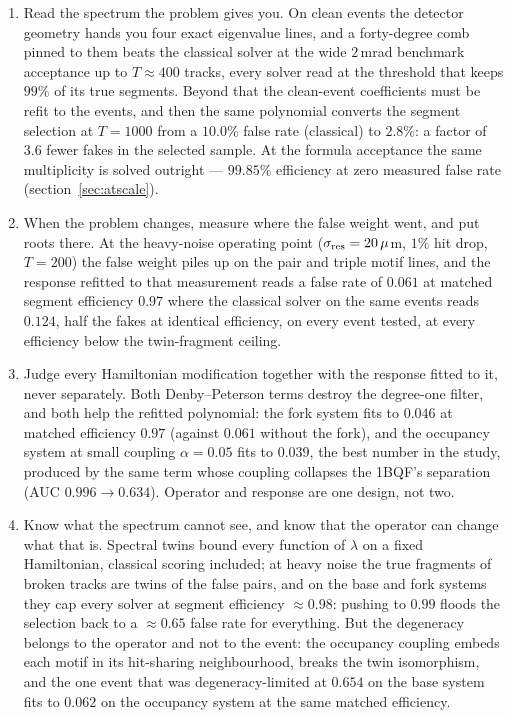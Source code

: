 \documentclass[11pt,a4paper]{article}
\begin{document}
\begin{enumerate}[leftmargin=2em]
\item Read the spectrum the problem gives you. On clean events the
detector geometry hands you four exact eigenvalue lines, and a
forty-degree comb pinned to them beats the classical solver at the
wide $2$\,mrad benchmark acceptance up to $T\approx400$ tracks, every
solver read at the threshold that keeps $99\%$ of its true segments.
Beyond that the clean-event coefficients must be refit to the events,
and then the same polynomial converts the segment selection at
$T=1000$ from a $10.0\%$ false rate (classical) to $2.8\%$: a factor
of $3.6$ fewer fakes in the selected sample. At the formula
acceptance the same multiplicity is solved outright — $99.85\%$
efficiency at zero measured false rate (section~\ref{sec:atscale}).
\item When the problem changes, measure where the false weight went,
and put roots there. At the heavy-noise operating point
($\sigma_{\rm res}=20\,\mu$m, $1\%$ hit drop, $T=200$) the false
weight piles up on the pair and triple motif lines, and the response
refitted to that measurement reads a false rate of $0.061$ at
matched segment efficiency $0.97$ where the classical solver on the
same events reads $0.124$, half the fakes at identical
efficiency, on every event tested, at every efficiency below the
twin-fragment ceiling.
\item Judge every Hamiltonian modification together with the
response fitted to it, never separately. Both Denby--Peterson terms
destroy the degree-one filter, and both help the refitted
polynomial: the fork system fits to $0.046$ at matched efficiency
$0.97$ (against $0.061$ without the fork), and the occupancy system
at small coupling $\alpha=0.05$ fits to $0.039$, the best number
in the study, produced by the same term whose coupling collapses
the 1BQF's separation (AUC $0.996\to0.634$). Operator and response
are one design, not two.
\item Know what the spectrum cannot see, and know that the
operator can change what that is. Spectral twins bound every
function of $\lambda$ on a fixed Hamiltonian, classical scoring
included; at heavy noise the true fragments of broken tracks are
twins of the false pairs, and on the base and fork systems they
cap every solver at segment efficiency $\approx0.98$: pushing to
$0.99$ floods the selection back to a $\approx0.65$ false rate for
everything. But the degeneracy belongs to the operator and not to
the event: the occupancy coupling embeds each motif in its
hit-sharing neighbourhood, breaks the twin isomorphism, and the one
event that was degeneracy-limited at $0.654$ on the base system fits to
$0.062$ on the occupancy system at the same matched efficiency.
\end{enumerate}
\end{document}

